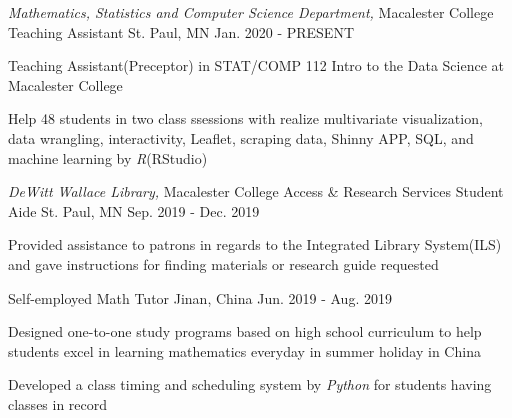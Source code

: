 

\begin{cventries}

  \cventry
    {\textit{Mathematics, Statistics and Computer Science Department,} Macalester College} %
    {Teaching Assistant} %
    {St. Paul, MN} %
    {Jan. 2020 - PRESENT} %
    {
      \begin{cvitems} %
        \item {Teaching Assistant(Preceptor) in STAT/COMP 112 Intro to the Data Science at Macalester College}
        \item {Help 48 students in two class ssessions with realize multivariate visualization, data wrangling, interactivity, Leaflet, scraping data, Shinny APP, SQL, and machine learning by  \textit{R}(RStudio)}
      \end{cvitems}
    }

  \cventry
    {\textit{DeWitt Wallace Library,} Macalester College} %
    {Access \& Research Services Student Aide} %
    {St. Paul, MN} %
    {Sep. 2019 - Dec. 2019} %
    {
      \begin{cvitems} %
        \item {Provided assistance to patrons in regards to the Integrated Library System(ILS) and gave instructions for finding materials or research guide requested}
      \end{cvitems}
    }

   \cventry
    {Self-employed} %
    {Math Tutor} %
    {Jinan, China} %
    {Jun. 2019 - Aug. 2019} %
    {
      \begin{cvitems} %
        \item {Designed one-to-one study programs based on high school curriculum to help students excel in learning mathematics everyday in summer holiday in China}
        \item {Developed a class timing and scheduling system by \textit{Python} for students having classes in record}
      \end{cvitems}
    }
    

\end{cventries}
